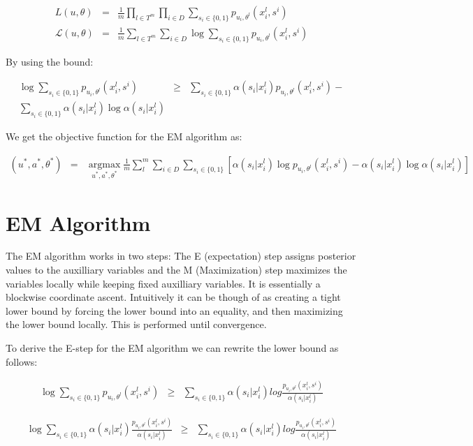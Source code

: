 \documentclass[11pt]{article}
\DeclareMathOperator*{\argmax}{argmax}
\begin{document}
\begin{eqnarray}
L(u, \theta) &=& \frac{1}{m} \prod_{l \in T^m} {\prod_{i \in D}{ \sum_{s_i\in\{0,1\}}{p_{u_i,\theta^l}(x_i^l,s^i)  } } }\\
\mathcal{L}(u, \theta) &=& \frac{1}{m} \sum_{l \in T^m} {\sum_{i \in D}{ \log \sum_{s_i\in\{0,1\}}{p_{u_i,\theta^l}(x_i^l,s^i)  } } }
\end{eqnarray}

By using the bound:

\begin{eqnarray}
\log \sum_{s_i \in \{0,1\}}{ p_{u_i,\theta^l}(x_i^l,s^i)} &\geq& \sum_{s_i \in \{0,1\}}{ \alpha(s_i | x_i^l) p_{u_i,\theta^l}(x_i^l,s^i)} - \\
\sum_{s_i \in \{0,1\}}{ \alpha(s_i | x_i^l)\log\alpha(s_i | x_i^l)}
\end{eqnarray}

We get the objective function for the EM algorithm as: 

\begin{eqnarray}
(u^*,a^*,\theta^*) &=& \argmax\limits_{u^*,a^*,\theta^*} \frac{1}{m} \sum_l^m{ \sum_{i \in D}{ \sum_{s_i \in\{0,1\}}   [\alpha(s_i | x_i^l) \log p_{u_i,\theta^l}(x_i^l,s^i) -  \alpha(s_i | x_i^l)\log\alpha(s_i | x_i^l)] }}
\end{eqnarray}

\section{EM Algorithm}
The EM algorithm works in two steps: The E (expectation) step assigns posterior values to the auxilliary variables and the M (Maximization) step maximizes the variables locally while keeping fixed auxilliary variables.
It is essentially a blockwise coordinate ascent. Intuitively it can be though of as creating a tight lower bound
by forcing the lower bound into an equality, and then maximizing the lower bound locally. This is performed until convergence.

To derive the E-step for the EM algorithm we can rewrite the lower bound as follows:

\begin{eqnarray}
\log \sum_{s_i \in \{0,1\}}{ p_{u_i,\theta^l}(x_i^l,s^i)} &\geq& \sum_{s_i \in\{0,1\}} \alpha(s_i | x_i^l) 
log{\frac{p_{u_i,\theta^l}(x_i^l,s^i)}{\alpha(s_i | x_i^l) }} 
\end{eqnarray}

\begin{eqnarray}
\log \sum_{s_i \in \{0,1\}}{ \alpha(s_i | x_i^l)  \frac{ p_{u_i,\theta^l}(x_i^l,s^i)}{\alpha(s_i | x_i^l) }} &\geq& \sum_{s_i \in\{0,1\}} \alpha(s_i | x_i^l) 
log{\frac{p_{u_i,\theta^l}(x_i^l,s^i)}{\alpha(s_i | x_i^l) }} 
\end{eqnarray}
\end{document}
